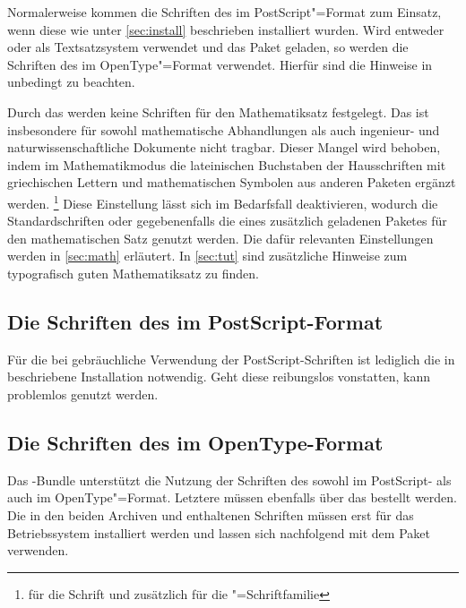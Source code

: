 \begin{Declaration*}{}
\begin{Declaration*}{}
\begin{Declaration*}{}
Normalerweise kommen die Schriften des \CDs im PostScript"=Format zum Einsatz, 
wenn diese wie unter \autoref{sec:install} beschrieben installiert wurden.
Wird entweder  oder  als Textsatzsystem 
verwendet und das Paket  geladen, so werden die Schriften des 
\CDs im OpenType"=Format verwendet. Hierfür sind die Hinweise in 
 unbedingt zu beachten.

Durch das \CD werden keine Schriften für den Mathematiksatz festgelegt. Das ist 
insbesondere für sowohl mathematische Abhandlungen als auch ingenieur- und 
naturwissenschaftliche Dokumente nicht tragbar. Dieser Mangel wird behoben, 
indem im Mathematikmodus die lateinischen Buchstaben der Hausschriften mit 
griechischen Lettern und mathematischen Symbolen aus anderen Paketen ergänzt 
werden.%
\footnote{%
   für die Schrift \DIN und zusätzlich  für 
  die \Univers"=Schriftfamilie%
}
Diese Einstellung lässt sich im Bedarfsfall deaktivieren, wodurch die 
Standardschriften oder gegebenenfalls die eines zusätzlich geladenen Paketes 
für den mathematischen Satz genutzt werden. Die dafür relevanten Einstellungen 
werden in \autoref{sec:math} erläutert. In \autoref{sec:tut} sind zusätzliche 
Hinweise zum typografisch guten Mathematiksatz zu finden.


\subsection{Die Schriften des \CDs im PostScript-Format}
%
%
Für die bei  gebräuchliche Verwendung der PostScript-Schriften 
ist lediglich die in  beschriebene Installation notwendig. 
Geht diese reibungslos vonstatten, kann \TUDScript problemlos genutzt werden.



\subsection{Die Schriften des \CDs im OpenType-Format}
%
%
%
Das \TUDScript-Bundle unterstützt die Nutzung der Schriften des \CDs sowohl 
im PostScript- als auch im OpenType"=Format. Letztere müssen ebenfalls über das 
bestellt werden. Die in den beiden Archiven  und 
 enthaltenen Schriften müssen erst für das Betriebssystem 
installiert werden und lassen sich nachfolgend mit dem Paket  
verwenden.


\end{Declaration*}
\end{Declaration*}
\end{Declaration*}
